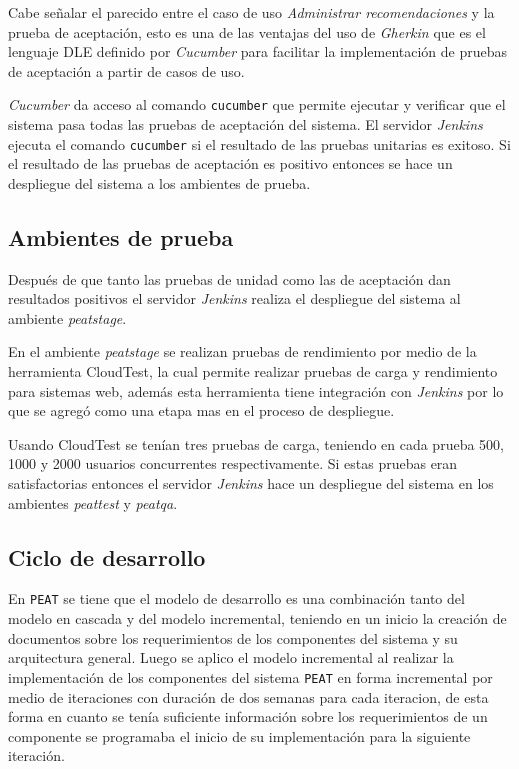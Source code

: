 Cabe señalar el parecido entre el caso de uso \textit{Administrar recomendaciones}
y la prueba de aceptación, esto es una de las ventajas del uso de \textit{Gherkin}
que es el lenguaje DLE definido por \textit{Cucumber} para facilitar la
implementación de pruebas de aceptación a partir de casos de uso.

\textit{Cucumber} da acceso al comando \texttt{cucumber} que permite ejecutar y
verificar que el sistema pasa todas las pruebas de aceptación del sistema.
El servidor \textit{Jenkins} ejecuta el comando \texttt{cucumber} si el resultado
de las pruebas unitarias es exitoso. Si el resultado de las pruebas de aceptación es
positivo entonces se hace un despliegue del sistema a los ambientes de prueba.

\subsection{Ambientes de prueba}

Después de que tanto las pruebas de unidad como las de aceptación dan resultados
positivos el servidor \textit{Jenkins} realiza el despliegue del sistema al ambiente
\textit{peatstage}.

En el ambiente \textit{peatstage} se realizan pruebas de rendimiento por medio
de la herramienta CloudTest, la cual permite realizar pruebas de carga y
rendimiento para sistemas web, además esta herramienta tiene integración con
\textit{Jenkins} por lo que se agregó como una etapa mas en el proceso de despliegue.

Usando CloudTest se tenían tres pruebas de carga, teniendo en cada prueba 500, 1000
y 2000 usuarios concurrentes respectivamente. Si estas pruebas eran satisfactorias
entonces el servidor \textit{Jenkins} hace un despliegue del sistema en los
ambientes \textit{peattest} y \textit{peatqa}.

\subsection{Ciclo de desarrollo}

En \texttt{PEAT} se tiene que el modelo de desarrollo es una combinación tanto del
modelo en cascada y del modelo incremental, teniendo en un inicio la creación de
documentos sobre los requerimientos de los componentes del sistema y su
arquitectura general. Luego se aplico el modelo incremental al realizar la
implementación de los componentes del sistema \texttt{PEAT} en forma incremental por
medio de iteraciones con duración de dos semanas para cada iteracion, de esta forma
en cuanto se tenía suficiente información sobre los requerimientos de un componente
se programaba el inicio de su implementación para la siguiente iteración.

